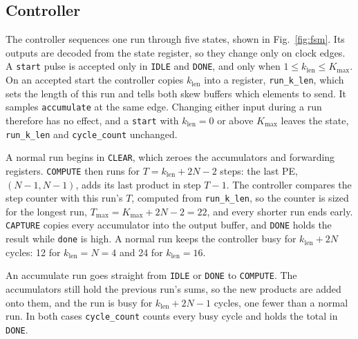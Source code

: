 
\subsection{Controller}
The controller sequences one run through five states, shown in Fig.~\ref{fig:fsm}. Its outputs are decoded from the state register, so they change only on clock edges. A \texttt{start} pulse is accepted only in \texttt{IDLE} and \texttt{DONE}, and only when $1 \le k_{\mathrm{len}} \le K_{\max}$. On an accepted start the controller copies $k_{\mathrm{len}}$ into a register, \texttt{run\_k\_len}, which sets the length of this run and tells both skew buffers which elements to send. It samples \texttt{accumulate} at the same edge. Changing either input during a run therefore has no effect, and a \texttt{start} with $k_{\mathrm{len}} = 0$ or above $K_{\max}$ leaves the state, \texttt{run\_k\_len} and \texttt{cycle\_count} unchanged.

A normal run begins in \texttt{CLEAR}, which zeroes the accumulators and forwarding registers. \texttt{COMPUTE} then runs for $T = k_{\mathrm{len}} + 2N - 2$ steps: the last PE, $(N{-}1, N{-}1)$, adds its last product in step $T-1$. The controller compares the step counter with this run's $T$, computed from \texttt{run\_k\_len}, so the counter is sized for the longest run, $T_{\max} = K_{\max} + 2N - 2 = 22$, and every shorter run ends early. \texttt{CAPTURE} copies every accumulator into the output buffer, and \texttt{DONE} holds the result while \texttt{done} is high. A normal run keeps the controller busy for $k_{\mathrm{len}} + 2N$ cycles: 12 for $k_{\mathrm{len}} = N = 4$ and 24 for $k_{\mathrm{len}} = 16$.

An accumulate run goes straight from \texttt{IDLE} or \texttt{DONE} to \texttt{COMPUTE}. The accumulators still hold the previous run's sums, so the new products are added onto them, and the run is busy for $k_{\mathrm{len}} + 2N - 1$ cycles, one fewer than a normal run. In both cases \texttt{cycle\_count} counts every busy cycle and holds the total in \texttt{DONE}.


